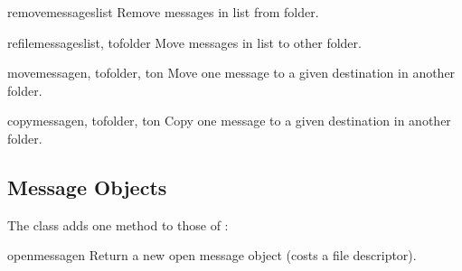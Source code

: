 \begin{methoddesc}[Folder]{removemessages}{list}
Remove messages in list from folder.
\end{methoddesc}

\begin{methoddesc}[Folder]{refilemessages}{list, tofolder}
Move messages in list to other folder.
\end{methoddesc}

\begin{methoddesc}[Folder]{movemessage}{n, tofolder, ton}
Move one message to a given destination in another folder.
\end{methoddesc}

\begin{methoddesc}[Folder]{copymessage}{n, tofolder, ton}
Copy one message to a given destination in another folder.
\end{methoddesc}


\subsection{Message Objects \label{mh-message-objects}}

The  class adds one method to those of
:

\begin{methoddesc}[Message]{openmessage}{n}
Return a new open message object (costs a file descriptor).
\end{methoddesc}
